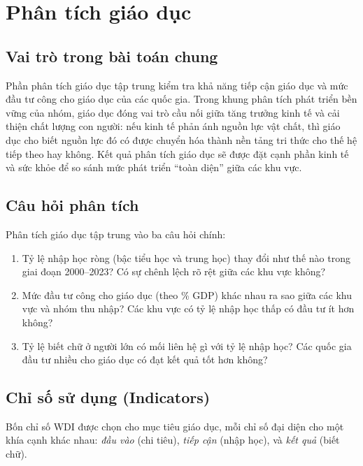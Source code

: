 \section{Phân tích giáo dục}

\subsection{Vai trò trong bài toán chung}

Phần phân tích giáo dục tập trung kiểm tra khả năng tiếp cận giáo dục và mức đầu tư công cho giáo dục của các quốc gia. Trong khung phân tích phát triển bền vững của nhóm, giáo dục đóng vai trò cầu nối giữa tăng trưởng kinh tế và cải thiện chất lượng con người: nếu kinh tế phản ánh nguồn lực vật chất, thì giáo dục cho biết nguồn lực đó có được chuyển hóa thành nền tảng tri thức cho thế hệ tiếp theo hay không. Kết quả phân tích giáo dục sẽ được đặt cạnh phần kinh tế và sức khỏe để so sánh mức phát triển ``toàn diện'' giữa các khu vực.

\subsection{Câu hỏi phân tích}

Phân tích giáo dục tập trung vào ba câu hỏi chính:

\begin{enumerate}
    \item Tỷ lệ nhập học ròng (bậc tiểu học và trung học) thay đổi như thế nào trong giai đoạn 2000--2023? Có sự chênh lệch rõ rệt giữa các khu vực không?
    \item Mức đầu tư công cho giáo dục (theo \% GDP) khác nhau ra sao giữa các khu vực và nhóm thu nhập? Các khu vực có tỷ lệ nhập học thấp có đầu tư ít hơn không?
    \item Tỷ lệ biết chữ ở người lớn có mối liên hệ gì với tỷ lệ nhập học? Các quốc gia đầu tư nhiều cho giáo dục có đạt kết quả tốt hơn không?
\end{enumerate}

\subsection{Chỉ số sử dụng (Indicators)}

Bốn chỉ số WDI được chọn cho mục tiêu giáo dục, mỗi chỉ số đại diện cho một khía cạnh khác nhau: \textit{đầu vào} (chi tiêu), \textit{tiếp cận} (nhập học), và \textit{kết quả} (biết chữ).

